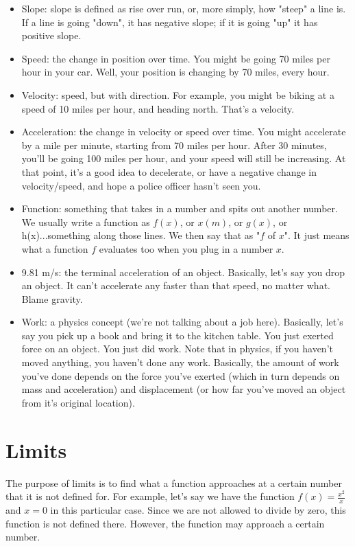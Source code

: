 \documentclass{memoir}
\begin{document}
\begin{itemize}
\item Slope: slope is defined as rise over run, or, more simply, how "steep" a line is. 
If a line is going "down", it has negative slope; if it is going "up" it has positive slope.
\item Speed: the change in position over time. 
You might be going 70 miles per hour in your car. 
Well, your  position is changing by 70 miles, every hour.
\item Velocity: speed, but with direction. 
For example, you might be biking at a speed of 10 miles per hour, and heading north. 
That's a velocity.
\item Acceleration: the change in velocity or speed over time. 
You might accelerate by a mile per minute, starting from 70 miles per hour. 
After 30 minutes, you'll be going 100 miles per hour, and your
speed will still be increasing. At that point, it's a good idea to
decelerate, or have a negative change in velocity/speed, and hope a
police officer hasn't seen you.
\item Function: something that takes in a number and spits out another
number. We usually write a function as $f(x)$, or $x(m)$, or $g(x)$, or
h(x)...something along those lines. We then say that as "$f$ of $x$". It
just means what a function $f$ evaluates too when you plug in a number $x$.
\item 9.81 m/s: the terminal acceleration of an object. Basically,
let's say you drop an object. It can't accelerate any faster than that
speed, no matter what. Blame gravity.
\item Work: a physics concept (we're not talking about a job here).
Basically, let's say you pick up a book and bring it to the kitchen
table. You just exerted force on an object. You just did work. Note
that in physics, if you haven't moved anything, you haven't done any
work. Basically, the amount of work you've done depends on the force
you've exerted (which in turn depends on mass and acceleration) and
displacement (or how far you've moved an object from it's original
location).
\end{itemize}
\section{Limits}

The purpose of limits is to find what a function approaches at a certain number that it is not defined for. 
For example, let's say we have the function $f(x) = \frac{x^2}{x}$ and $x = 0$ in this particular case. 
Since we are not allowed to divide by zero, this function is not defined there. 
However, the function may approach a certain number.
\end{document}
